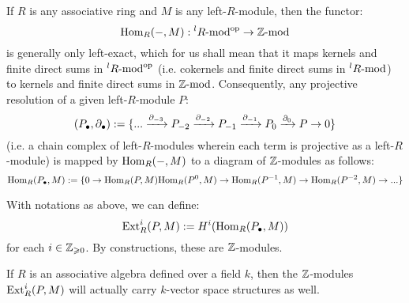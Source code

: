        If $R$ is any associative ring and $M$ is any left-$R$-module, then the functor:
            $$\Hom_R(-, M): {}^lR\mod^{\op} \to \Z\mod$$
        is generally only left-exact, which for us shall mean that it maps kernels and finite direct sums in ${}^lR\mod^{\op}$ (i.e. cokernels and finite direct sums in ${}^lR\mod$) to kernels and finite direct sums in $\Z\mod$. Consequently, any projective resolution of a given left-$R$-module $P$:
            $$(P_{\bullet}, \del_{\bullet}) := \{ ... \xrightarrow[]{\del_{-3}} P_{-2} \xrightarrow[]{\del_{-2}} P_{-1} \xrightarrow[]{\del_{-1}} P_0 \xrightarrow[]{\del_0} P \to 0 \}$$
        (i.e. a chain complex of left-$R$-modules wherein each term is projective as a left-$R$-module) is mapped by $\Hom_R(-, M)$ to a diagram of $\Z$-modules as follows:
            $$\Hom_R(P_{\bullet}, M) := \{ 0 \to \Hom_R(P, M) \Hom_R(P^0, M) \to \Hom_R(P^{-1}, M) \to \Hom_R(P^{-2}, M) \to ... \}$$
        \begin{definition} \label{def: Ext_groups}
            With notations as above, we can define:
                $$\Ext^i_R(P, M) := H^i(\Hom_R(P_{\bullet}, M))$$
            for each $i \in \Z_{\geq 0}$. By constructions, these are $\Z$-modules. 
        \end{definition}
        \begin{remark}
            If $R$ is an associative algebra defined over a field $k$, then the $\Z$-modules $\Ext^i_R(P, M)$ will actually carry $k$-vector space structures as well.
        \end{remark}
